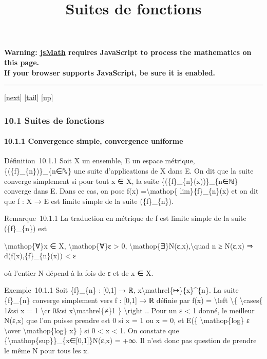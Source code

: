 \documentclass[]{article}
\title{Suites de fonctions}
\author{}
\date{}
\begin{document}
\maketitle

\textbf{Warning: \href{http://www.math.union.edu/locate/jsMath}{jsMath}
requires JavaScript to process the mathematics on this page.\\ If your
browser supports JavaScript, be sure it is enabled.}

\begin{center}\rule{3in}{0.4pt}\end{center}

{[}\href{coursse61.html}{next}{]}
{[}\hyperref[tailcoursse60.html]{tail}{]}
{[}\href{coursch11.html\#coursse60.html}{up}{]}

\subsubsection{10.1 Suites de fonctions}

\paragraph{10.1.1 Convergence simple, convergence uniforme}

Définition~10.1.1 Soit X un ensemble, E un espace métrique,
\{(\{f\}\_\{n\})\}\_\{n∈ℕ\} une suite d'applications de X dans E. On dit
que la suite converge simplement si pour tout x ∈ X, la suite
\{(\{f\}\_\{n\}(x))\}\_\{n∈ℕ\} converge dans E. Dans ce cas, on pose
f(x) =\textbackslash{}mathop\{ lim\}\{f\}\_\{n\}(x) et on dit que f : X
→ E est limite simple de la suite (\{f\}\_\{n\}).

Remarque~10.1.1 La traduction en métrique de f est limite simple de la
suite (\{f\}\_\{n\}) est

\textbackslash{}mathop\{∀\}x ∈ X, \textbackslash{}mathop\{∀\}ε
\textgreater{} 0, \textbackslash{}mathop\{∃\}N(ε,x),\textbackslash{}quad
n ≥ N(ε,x) ⇒ d(f(x),\{f\}\_\{n\}(x)) \textless{} ε

où l'entier N dépend à la fois de ε et de x ∈ X.

Exemple~10.1.1 Soit \{f\}\_\{n\} : {[}0,1{]} → ℝ,
x\textbackslash{}mathrel\{↦\}\{x\}\^{}\{n\}. La suite \{f\}\_\{n\}
converge simplement vers f : {[}0,1{]} → ℝ définie par f(x) =
\textbackslash{}left \textbackslash{}\{ \textbackslash{}cases\{ 1\&si x
= 1 \textbackslash{}cr 0\&si x\textbackslash{}mathrel\{≠\}1 \}
\textbackslash{}right .. Pour un ε \textless{} 1 donné, le meilleur
N(ε,x) que l'on puisse prendre est 0 si x = 1 ou x = 0, et E(\{
\textbackslash{}mathop\{log\} ε \textbackslash{}over
\textbackslash{}mathop\{log\} x\} ) si 0 \textless{} x \textless{} 1. On
constate que \{\textbackslash{}mathop\{sup\}\}\_\{x∈{[}0,1{]}\}N(ε,x) =
+∞. Il n'est donc pas question de prendre le même N pour tous les x.
\end{document}
